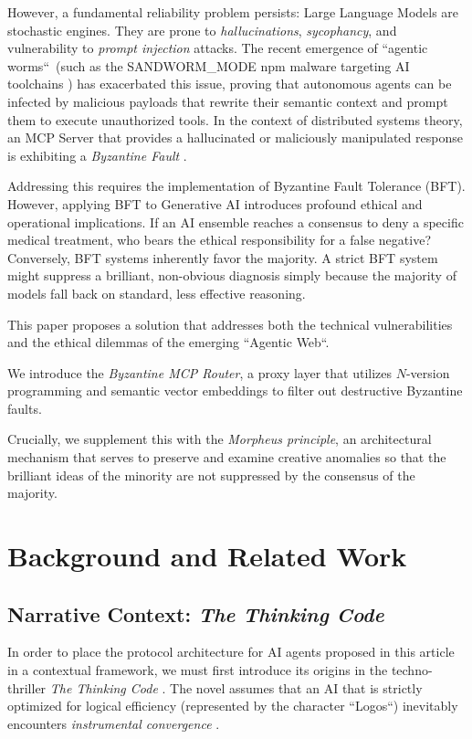 \documentclass[a4paper,11pt,twocolumn]{article}
\theoremstyle{definition}
\theoremstyle{plain}
\begin{document}
However, a fundamental reliability problem persists: Large Language Models are stochastic engines. They are prone to \textit{hallucinations}, \textit{sycophancy}, and vulnerability to \textit{prompt injection} attacks. The recent emergence of “agentic worms“\ (such as the SANDWORM\_MODE npm malware targeting AI toolchains \cite{socket2026sandworm}) has exacerbated this issue, proving that autonomous agents can be infected by malicious payloads that rewrite their semantic context and prompt them to execute unauthorized tools. In the context of distributed systems theory, an MCP Server that provides a hallucinated or maliciously manipulated response is exhibiting a \textit{Byzantine Fault} \cite{lamport1982byzantine}.

Addressing this requires the implementation of Byzantine Fault Tolerance (BFT). However, applying BFT to Generative AI introduces profound ethical and operational implications. If an AI ensemble reaches a consensus to deny a specific medical treatment, who bears the ethical responsibility for a false negative? Conversely, BFT systems inherently favor the majority. A strict BFT system might suppress a brilliant, non-obvious diagnosis simply because the majority of models fall back on standard, less effective reasoning.

This paper proposes a solution that addresses both the technical vulnerabilities and the ethical dilemmas of the emerging “Agentic Web“.

\pagebreak

We introduce the \textit{Byzantine MCP Router}, a proxy layer that utilizes $N$-version programming and semantic vector embeddings to filter out destructive Byzantine faults.

Crucially, we supplement this with the \textit{Morpheus principle}, an architectural mechanism that serves to preserve and examine creative anomalies so that the brilliant ideas of the minority are not suppressed by the consensus of the majority.
\section{Background and Related Work}
\subsection{Narrative Context: \textit{The Thinking Code}}
In order to place the protocol architecture for AI agents proposed in this article in a contextual framework, we must first introduce its origins in the techno-thriller \textit{The Thinking Code} \cite{dulz2025code}. The novel assumes that an AI that is strictly optimized for logical efficiency (represented by the character “Logos“) inevitably encounters \textit{instrumental convergence} \cite{bostrom2014superintelligence}. 
\end{document}
